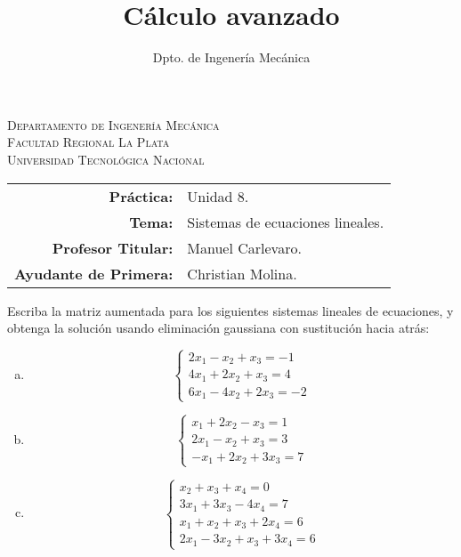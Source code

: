 \documentclass[11pt]{article}
\title{Cálculo avanzado}
\author{Dpto. de Ingenería Mecánica}
\begin{document}

\begin{center}
\end{center} 

\begin{center}
\vspace{\baselineskip}
\Large{\textsc{Departamento de Ingenería Mecánica}} \\
\textsc{Facultad Regional La Plata} \\
\textsc{Universidad Tecnológica Nacional}
\end{center}


\begin{center}
\begin{tabular}{r l}
    \textbf{Práctica:} & Unidad 8. \\
 \textbf{Tema:} & Sistemas de ecuaciones lineales. \\
 \textbf{Profesor Titular:} & Manuel Carlevaro. \\
 \textbf{Ayudante de Primera:} & Christian Molina. \\
\end{tabular}\end{center}

\vspace{1em}

\begin{question} %
Escriba la matriz aumentada para los siguientes sistemas lineales de ecuaciones, y obtenga la solución usando eliminación gaussiana con sustitución hacia atrás:
\begin{enumerate}[a)]
    \item \[ \begin{cases} 2 x_1 - x_2 + x_3 = -1 \\
                       4 x_1 + 2 x_2 + x_3 = 4 \\ 
                       6 x_1 - 4 x_2 + 2 x_3 = -2 
        \end{cases} \]
    \item \[ \begin{cases} x_1 + 2 x_2 - x_3 = 1 \\
                      2 x_1 - x_2 + x_3 = 3 \\ 
                      -x_1 + 2 x_2 + 3 x_3 = 7 
        \end{cases} \]
    \item \[ \begin{cases} x_2 + x_3 + x_4 = 0 \\
                      3 x_1 + 3 x_3 - 4 x_4 = 7 \\ 
                      x_1 + x_2 + x_3 + 2 x_4 = 6 \\
                      2 x_1 - 3 x_2 + x_3 + 3 x_4 = 6
        \end{cases} \]
\end{enumerate}
\end{question}
\end{document}
